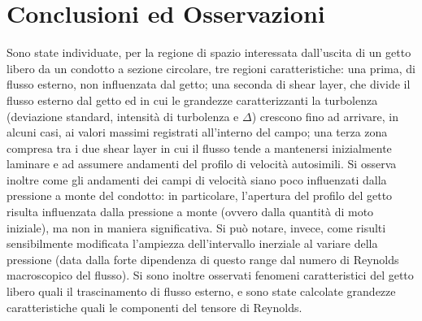 \documentclass{article} %
\begin{document}
\section{Conclusioni ed Osservazioni}
Sono state individuate, per la regione di spazio interessata dall'uscita di un getto libero da un condotto a sezione circolare, tre regioni caratteristiche: una prima, di flusso esterno, non influenzata dal getto; una seconda di shear layer, che divide il flusso esterno dal getto ed in cui le grandezze caratterizzanti la turbolenza (deviazione standard, intensità di turbolenza e $\Delta$) crescono fino ad arrivare, in alcuni casi, ai valori massimi registrati all'interno del campo; una terza zona compresa tra i due shear layer in cui il flusso tende a mantenersi inizialmente laminare e ad assumere andamenti del profilo di velocità autosimili. Si osserva inoltre come gli andamenti dei campi di velocità siano poco influenzati dalla pressione a monte del condotto: in particolare, l'apertura del profilo del getto risulta influenzata dalla pressione a monte (ovvero dalla quantità di moto iniziale), ma non in maniera significativa. Si può notare, invece, come risulti sensibilmente modificata l'ampiezza dell'intervallo inerziale al variare della pressione (data dalla forte dipendenza di questo range dal numero di Reynolds macroscopico del flusso). Si sono inoltre osservati fenomeni caratteristici del getto libero quali il trascinamento di flusso esterno, e sono state calcolate grandezze caratteristiche quali le componenti del tensore di Reynolds.


\end{document}
